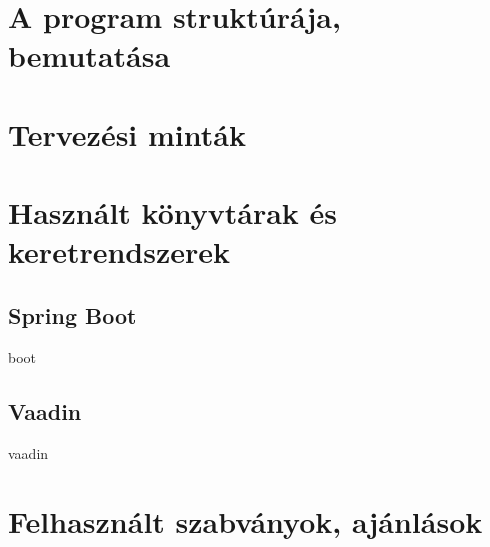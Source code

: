 \section{A program struktúrája, bemutatása}

\section{Tervezési minták}









\section{Használt könyvtárak és keretrendszerek}



\subsection{Spring Boot}

boot



\subsection{Vaadin}

vaadin

\section{Felhasznált szabványok, ajánlások}







